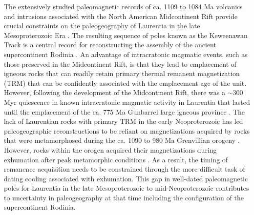 \documentclass[draft]{agujournal2019}
\begin{document}
The extensively studied paleomagnetic records of ca. 1109 to 1084 Ma volcanics and intrusions associated with the North American Midcontinent Rift provide crucial constraints on the paleogeography of Laurentia in the late Mesoproterozoic Era \cite{Halls1982a, Fairchild2017a, Swanson-Hysell2019a}. The resulting sequence of poles known as the Keweenawan Track is a central record for reconstructing the assembly of the ancient supercontinent Rodinia \cite{Evans2021b}. An advantage of intracratonic magmatic events, such as those preserved in the Midcontinent Rift, is that they lead to emplacement of igneous rocks that can readily retain primary thermal remanent magnetization (TRM) that can be confidently associated with the emplacement age of the unit. However, following the development of the Midcontinent Rift, there was a $\sim$300 Myr quiescence in known intracratonic magmatic activity in Laurentia that lasted until the emplacement of the ca. 775 Ma Gunbarrel large igneous province \cite{Harlan2003a, Mackinder2019a, Swanson-Hysell2021c}. The lack of Laurentian rocks with primary TRM in the early Neoproterozoic has led paleogeographic reconstructions to be reliant on magnetizations acquired by rocks that were metamorphosed during the ca. 1090 to 980 Ma Grenvillian orogeny \cite{Rivers2008a, Rivers2012a, Swanson-Hysell2023a}. However, rocks within the orogen acquired their magnetizations during exhumation after peak metamorphic conditions \cite{McWilliams1975a}. As a result, the timing of remanence acquisition needs to be constrained through the more difficult task of dating cooling associated with exhumation. This gap in well-dated paleomagnetic poles for Laurentia in the late Mesoproterozoic to mid-Neoproterozoic contributes to uncertainty in paleogeography at that time including the configuration of the supercontinent Rodinia.
\end{document}
